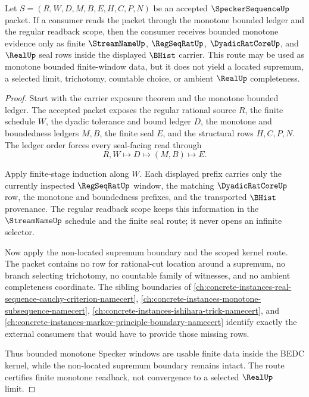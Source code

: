 \begin{theorem}
\label{thm:specker-sequence-monotone-bounded-nonconvergence-route}
Let $S=(R,W,D,M,B,E,H,C,P,N)$ be an accepted $\SpeckerSequenceUp$ packet. If a consumer reads the packet through the monotone bounded ledger and the regular readback scope, then the consumer receives bounded monotone evidence only as finite $\StreamNameUp$, $\RegSeqRatUp$, $\DyadicRatCoreUp$, and $\RealUp$ seal rows inside the displayed $\BHist$ carrier. This route may be used as monotone bounded finite-window data, but it does not yield a located supremum, a selected limit, trichotomy, countable choice, or ambient $\RealUp$ completeness.
\end{theorem}
\begin{proof}
Start with the carrier exposure theorem and the monotone bounded ledger. The accepted packet exposes the regular rational source $R$, the finite schedule $W$, the dyadic tolerance and bound ledger $D$, the monotone and boundedness ledgers $M,B$, the finite seal $E$, and the structural rows $H,C,P,N$. The ledger order forces every seal-facing read through
$$
R,W\longmapsto D\longmapsto (M,B)\longmapsto E.
$$

Apply finite-stage induction along $W$. Each displayed prefix carries only the currently inspected $\RegSeqRatUp$ window, the matching $\DyadicRatCoreUp$ row, the monotone and boundedness prefixes, and the transported $\BHist$ provenance. The regular readback scope keeps this information in the $\StreamNameUp$ schedule and the finite seal route; it never opens an infinite selector.

Now apply the non-located supremum boundary and the scoped kernel route. The packet contains no row for rational-cut location around a supremum, no branch selecting trichotomy, no countable family of witnesses, and no ambient completeness coordinate. The sibling boundaries of \autoref{ch:concrete-instances-real-sequence-cauchy-criterion-namecert}, \autoref{ch:concrete-instances-monotone-subsequence-namecert}, \autoref{ch:concrete-instances-ishihara-trick-namecert}, and \autoref{ch:concrete-instances-markov-principle-boundary-namecert} identify exactly the external consumers that would have to provide those missing rows.

Thus bounded monotone Specker windows are usable finite data inside the BEDC kernel, while the non-located supremum boundary remains intact. The route certifies finite monotone readback, not convergence to a selected $\RealUp$ limit.
\end{proof}

